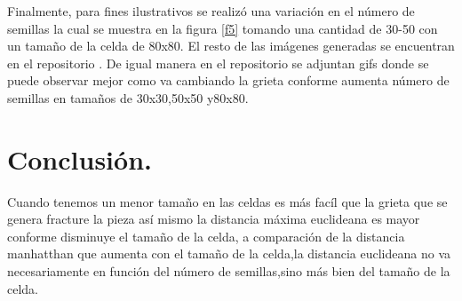 \documentclass{article}
\begin{document}
Finalmente, para fines ilustrativos se realiz\'o una variaci\'on en el n\'umero de semillas la cual se muestra en la figura \ref{f5} tomando una cantidad de 30-50 con un tama\~no de la  celda de 80x80.
El resto de las im\'agenes generadas se encuentran en el repositorio \citep{ana}. De igual manera en el repositorio se adjuntan gifs donde se puede observar mejor como va cambiando la grieta conforme aumenta n\'umero de semillas en tama\~nos de 30x30,50x50 y80x80.

  \section{Conclusi\'{o}n.}\label{con}
Cuando tenemos un menor tama\~no en las celdas es m\'as fac\'il que la grieta que se genera fracture la pieza as\'i mismo la distancia m\'axima euclideana es mayor conforme disminuye el tama\~no de la celda, a comparaci\'on de la distancia manhatthan que aumenta con el tama\~no de la celda,la distancia euclideana no va necesariamente en funci\'on del n\'umero de semillas,sino m\'as bien del tama\~no de la celda.

  
  
\end{document}
